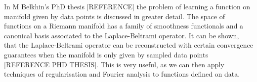 \documentclass[journal, a4paper]{IEEEtran}
\begin{document}
In M Belkhin's PhD thesis [REFERENCE] the problem of learning a function on manifold given by data points is discussed in greater detail. The space of functions on a Riemann manifold has a family of smoothness functionals and a canonical basis associated to the Laplace-Beltrami operator. It can be shown, that the Laplace-Beltrami operator can be reconstructed with certain convergence guarantees when the manifold is only given by sampled data points [REFERENCE PHD THESIS]. This is very useful, as we can then apply techniques of regularisation and Fourier analysis to functions defined on data. 
 
 
%
\end{document}

